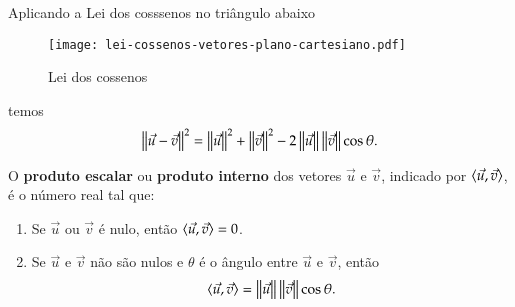 Aplicando a Lei dos cosssenos no tri\^angulo abaixo
\begin{figure}[!h]
  \centering
  \caption{Lei dos cossenos}
  \texttt{[image: lei-cossenos-vetores-plano-cartesiano.pdf]}


\end{figure}
temos
\begin{align}\label{equacaonorma}
  \left\Vert{\vec{u} - \vec{v}}\right\Vert^2 = \left\Vert{\vec{u}}\right\Vert^2 + \left\Vert{\vec{v}}\right\Vert^2 - 2\left\Vert{\vec{u}}\right\Vert\left\Vert{\vec{v}}\right\Vert\cos\theta.
\end{align}



\begin{definicao}\label{produtointerno}
  O \textbf{produto escalar} ou \textbf{produto interno} dos vetores $\vec{u}$ e $\vec{v}$, indicado por $\langle \vec{u}, \vec{v} \rangle$, \'e o n\'umero real tal que:
  \begin{enumerate}
    \item Se $\vec{u}$ ou $\vec{v}$ \'e nulo, ent\~ao $\langle \vec{u}, \vec{v} \rangle = 0$.
    \item Se $\vec{u}$ e $\vec{v}$ n\~ao s\~ao nulos e $\theta$ \'e o \^angulo entre $\vec{u}$ e $\vec{v}$, ent\~ao
    \begin{align}\label{produto-interno}
      \langle \vec{u}, \vec{v} \rangle = \left\Vert{\vec{u}}\right\Vert\left\Vert{\vec{v}}\right\Vert\cos\theta.
    \end{align}
  \end{enumerate}
\end{definicao}

